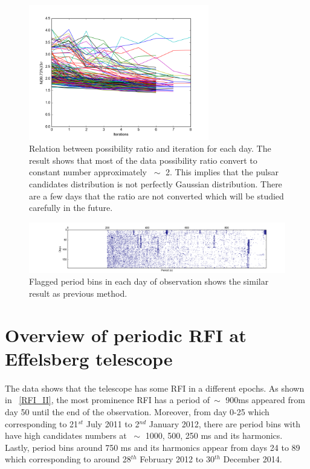 \documentclass[thesis_msc.tex]{subfiles}
\begin{document}
\begin{figure}[h!] 
\centering
\includegraphics[width=0.7\textwidth]{figures/3sig.png}
\caption{Relation between possibility ratio and iteration for each day. The result shows that most of the data possibility ratio convert to constant number approximately $~\sim$ 2. This implies that the pulsar candidates distribution is not perfectly Gaussian distribution. There are a few days that the ratio are not converted which will be studied carefully in the future.}
\label{RFI_3sig}
\end{figure}

\begin{figure}[h!] 
\centering
\includegraphics[width=1.0\textwidth]{figures/method2.png}
\caption{Flagged period bins in each day of observation shows the similar result as previous method.}
\label{RFI_III}
\end{figure}
 
 \section{Overview of periodic RFI at Effelsberg telescope }
 \paragraph{} The data shows that the telescope has some RFI in a different epochs. As shown in ~\ref{RFI_II}, the most prominence RFI has a period of$~\sim$ 900ms appeared from day 50 until the end of the observation. Moreover, from day 0-25 which corresponding to 21$^{st}$  July 2011 to 2$^{nd}$  January 2012, there are period bins with have high candidates numbers at $~\sim$ 1000, 500, 250 ms and its harmonics. Lastly, period bins around 750 ms and its harmonics appear from days 24 to 89 which corresponding to around 28$^{th}$ February 2012 to 30$^{th}$  December 2014.  
    
\end{document}
